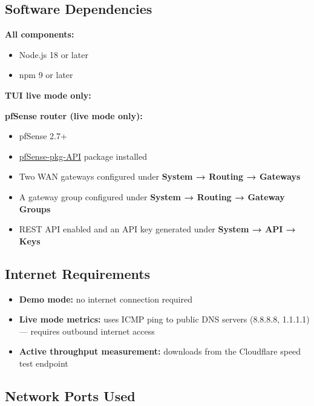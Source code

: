 \documentclass[11pt, a4paper]{article}
\newcommand{\code}[1]{%
  \texttt{\small\colorbox{lightgray}{\strut\,#1\,}}%
}
\begin{document}
\subsection{Software Dependencies}

\textbf{All components:}
\begin{itemize}
  \item Node.js 18 or later
  \item npm 9 or later
\end{itemize}

\textbf{TUI live mode only:}

\textbf{pfSense router (live mode only):}
\begin{itemize}
  \item pfSense 2.7+
  \item \href{https://github.com/jaredhendrickson13/pfsense-api}{pfSense-pkg-API} package installed
  \item Two WAN gateways configured under \textbf{System → Routing → Gateways}
  \item A gateway group configured under \textbf{System → Routing → Gateway Groups}
  \item REST API enabled and an API key generated under \textbf{System → API → Keys}
\end{itemize}

\subsection{Internet Requirements}

\begin{itemize}
  \item \textbf{Demo mode:} no internet connection required
  \item \textbf{Live mode metrics:} uses ICMP ping to public DNS servers (8.8.8.8, 1.1.1.1) — requires outbound internet access
  \item \textbf{Active throughput measurement:} downloads from the Cloudflare speed test endpoint
\end{itemize}

\subsection{Network Ports Used}
\end{document}
